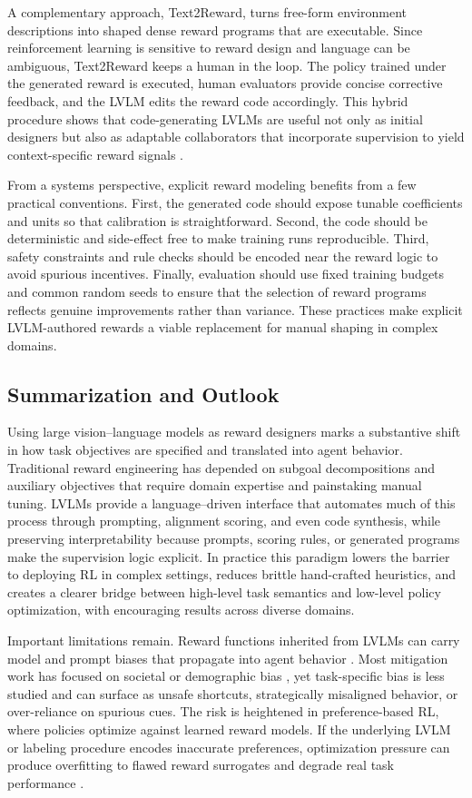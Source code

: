 \documentclass[master,english,final]{kaist-ucs}
\begin{document}
A complementary approach, Text2Reward, turns free-form environment descriptions into shaped dense reward programs that are executable. Since reinforcement learning is sensitive to reward design and language can be ambiguous, Text2Reward keeps a human in the loop. The policy trained under the generated reward is executed, human evaluators provide concise corrective feedback, and the LVLM edits the reward code accordingly. This hybrid procedure shows that code-generating LVLMs are useful not only as initial designers but also as adaptable collaborators that incorporate supervision to yield context-specific reward signals \cite{xie2023text2reward}.

From a systems perspective, explicit reward modeling benefits from a few practical conventions. First, the generated code should expose tunable coefficients and units so that calibration is straightforward. Second, the code should be deterministic and side-effect free to make training runs reproducible. Third, safety constraints and rule checks should be encoded near the reward logic to avoid spurious incentives. Finally, evaluation should use fixed training budgets and common random seeds to ensure that the selection of reward programs reflects genuine improvements rather than variance. These practices make explicit LVLM-authored rewards a viable replacement for manual shaping in complex domains.

\subsection{Summarization and Outlook}
Using large vision–language models as reward designers marks a substantive shift in how task objectives are specified and translated into agent behavior. Traditional reward engineering has depended on subgoal decompositions and auxiliary objectives that require domain expertise and painstaking manual tuning. LVLMs provide a language–driven interface that automates much of this process through prompting, alignment scoring, and even code synthesis, while preserving interpretability because prompts, scoring rules, or generated programs make the supervision logic explicit. In practice this paradigm lowers the barrier to deploying RL in complex settings, reduces brittle hand-crafted heuristics, and creates a clearer bridge between high-level task semantics and low-level policy optimization, with encouraging results across diverse domains.

Important limitations remain. Reward functions inherited from LVLMs can carry model and prompt biases that propagate into agent behavior \cite{ferrara2023should}. Most mitigation work has focused on societal or demographic bias \cite{gallegos2024bias}, yet task-specific bias is less studied and can surface as unsafe shortcuts, strategically misaligned behavior, or over-reliance on spurious cues. The risk is heightened in preference-based RL, where policies optimize against learned reward models. If the underlying LVLM or labeling procedure encodes inaccurate preferences, optimization pressure can produce overfitting to flawed reward surrogates and degrade real task performance \cite{gao2023scaling}.
\end{document}
